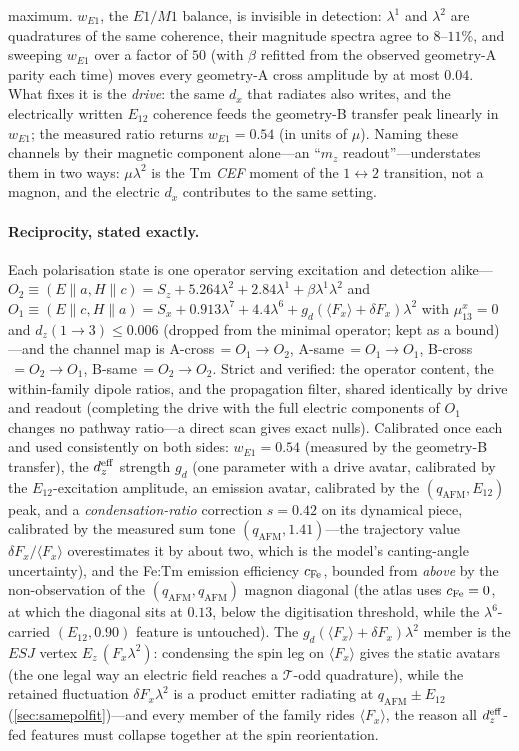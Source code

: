 \documentclass[11pt,a4paper]{article}
\newcommand{\qafm}{q_{\mathrm{AFM}}}
\begin{document}
maximum.  $w_{E1}$, the $E1/M1$ balance, is invisible in detection:
$\lambda^1$ and $\lambda^2$ are quadratures of the same coherence, their
magnitude spectra agree to $8$--$11\%$, and sweeping $w_{E1}$ over a
factor of $50$ (with $\beta$ refitted from the observed geometry-A
parity each time) moves every geometry-A cross amplitude by at most
$0.04$.  What fixes it is the \emph{drive}: the same $d_x$ that radiates
also writes, and the electrically written $E_{12}$ coherence feeds the
geometry-B transfer peak linearly in $w_{E1}$; the measured ratio
returns $w_{E1}=0.54$ (in units of $\mu$).  Naming these channels by
their magnetic component alone---an ``$m_z$ readout''---understates
them in two ways: $\mu\lambda^2$ is the Tm \emph{CEF} moment of the
$1\!\leftrightarrow\!2$ transition, not a magnon, and the electric
$d_x$ contributes to the same setting.

\paragraph{Reciprocity, stated exactly.}  Each polarisation state is
one operator serving excitation and detection alike---
$O_2\equiv(E\!\parallel\!a,H\!\parallel\!c)
=S_z+5.264\lambda^2+2.84\lambda^1+\beta\lambda^1\lambda^2$ and
$O_1\equiv(E\!\parallel\!c,H\!\parallel\!a)
=S_x+0.913\lambda^7+4.4\lambda^6
+g_d(\langle F_x\rangle+\delta F_x)\lambda^2$ with
$\mu^x_{13}=0$ and $d_z(1\!\to\!3)\leq0.006$ (dropped from the
minimal operator; kept as a bound)---and the channel map is
A-cross$\,=O_1\!\to\!O_2$, A-same$\,=O_1\!\to\!O_1$,
B-cross$\,=O_2\!\to\!O_1$, B-same$\,=O_2\!\to\!O_2$.  Strict and
verified: the operator content, the within-family dipole ratios, and
the propagation filter, shared identically by drive and readout
(completing the drive with the full electric components of $O_1$
changes no pathway ratio---a direct scan gives exact nulls).
Calibrated once each and used consistently on both sides: $w_{E1}=0.54$
(measured by the geometry-B transfer), the $d_z^{\rm eff}$ strength
$g_d$ (one parameter with a drive avatar, calibrated by the
$E_{12}$-excitation amplitude, an emission avatar, calibrated by
the $(\qafm,E_{12})$ peak, and a \emph{condensation-ratio} correction
$s=0.42$ on its dynamical piece, calibrated by the measured sum tone
$(\qafm,1.41)$---the trajectory value $\delta F_x/\langle F_x\rangle$
overestimates it by about two, which is the model's canting-angle
uncertainty), and the Fe:Tm emission efficiency $c_{\rm Fe}$,
bounded from \emph{above} by the non-observation of the
$(\qafm,\qafm)$ magnon diagonal (the atlas uses $c_{\rm Fe}=0$, at
which the diagonal sits at $0.13$, below the digitisation threshold,
while the $\lambda^6$-carried $(E_{12},0.90)$ feature is untouched).
The $g_d(\langle F_x\rangle+\delta F_x)\lambda^2$ member is the $ESJ$
vertex $E_z\,(F_x\lambda^2)$: condensing the spin leg on
$\langle F_x\rangle$ gives the static avatars (the one legal way an
electric field reaches a $\mathcal T$-odd quadrature), while the
retained fluctuation $\delta F_x\lambda^2$ is a product emitter
radiating at $\qafm\pm E_{12}$ (\cref{sec:samepolfit})---and every
member of the family rides $\langle F_x\rangle$, the reason all
$d_z^{\rm eff}$-fed features must collapse together at the spin
reorientation.
\end{document}
